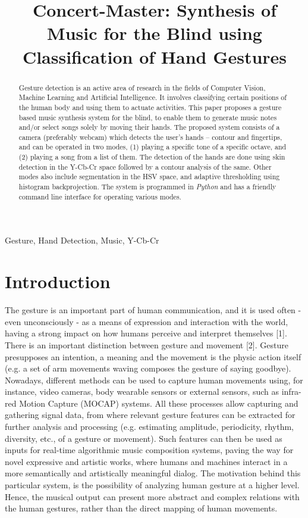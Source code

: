 \documentclass[letterpaper, 11 pt, twoside, conference]{ieeeconf}
\title{Concert-Master: Synthesis of Music for the Blind using Classification of Hand Gestures}
\begin{document}
%
\maketitle
%
\begin{abstract}

Gesture detection is an active area of research in the fields of Computer Vision,
Machine Learning and Artificial Intelligence. It involves classifying certain
positions of the human body and using them to actuate activities. This paper
proposes a gesture based music synthesis system for the blind, to enable them
to generate music notes and/or select songs solely by moving their hands. The
proposed system consists of a camera (preferably webcam) which detects the user's
hands -- contour and fingertips, and can be operated in two modes, (1) playing a
specific tone of a specific octave, and (2) playing a song from a list of them.
The detection of the hands are done using skin detection in the Y-Cb-Cr space
followed by a contour analysis of the same. Other modes also include segmentation
in the HSV space, and adaptive thresholding using histogram backprojection.
The system is programmed in \textit{Python} and has a friendly command line
interface for operating various modes.
\end{abstract}
%
\begin{keywords}
Gesture, Hand Detection, Music, Y-Cb-Cr
\end{keywords}
%
\section{Introduction}
\label{sec:intro}

The gesture is an important part of human communication,
and it is used often - even unconsciously - as a means of expression and interaction with the world, having a strong impact on how humans perceive and interpret themselves [1]. There is an important distinction between gesture and movement [2]. Gesture presupposes an intention, a meaning and the movement is the physic action itself (e.g. a set of arm movements waving composes the gesture of saying goodbye). Nowadays, different methods can be used to capture human
movements using, for instance, video cameras, body wearable sensors or external sensors, such as infra-red Motion Capture (MOCAP) systems. All these processes allow capturing and gathering signal data, from where relevant gesture features can be extracted for further analysis and processing (e.g. estimating amplitude, periodicity, rhythm, diversity, etc., of a gesture or movement). Such features can then be used as inputs for real-time algorithmic music composition systems, paving the way for novel expressive and artistic works, where humans and machines interact in a more semantically and artistically meaningful dialog. The motivation behind this particular system, is the possibility of analyzing human gesture at a higher level. Hence, the musical output can present more abstract and complex relations with the human gestures, rather than the direct mapping of human movements.
\end{document}
